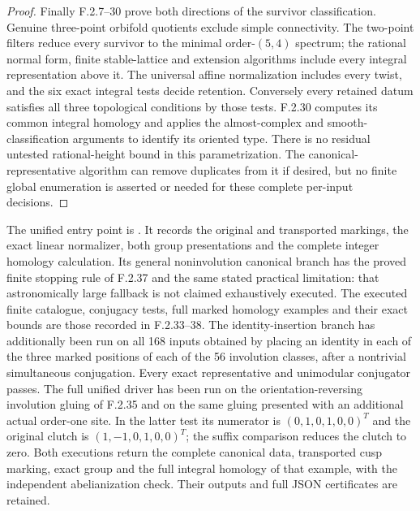 \begin{proof}
Finally F.2.7--30 prove both directions of the survivor
classification.  Genuine three-point orbifold quotients
exclude simple connectivity.  The two-point filters reduce
every survivor to the minimal order-$(5,4)$ spectrum; the
rational normal form, finite stable-lattice and extension
algorithms include every integral representation above it.
The universal affine normalization includes every twist,
and the six exact integral tests decide retention.
Conversely every retained datum satisfies all three
topological conditions by those tests.  F.2.30 computes
its common integral homology and applies the almost-complex
and smooth-classification arguments to identify its oriented
type.  There is no residual untested rational-height bound
in this parametrization.  The canonical-representative
algorithm can remove duplicates from it if desired, but
no finite global enumeration is asserted or needed for
these complete per-input decisions.
\end{proof}

The unified entry point is
.
It records the original and transported markings, the exact
linear normalizer, both group presentations and the complete
integer homology calculation.  Its general noninvolution
canonical branch has the proved finite stopping rule of
F.2.37 and the same stated practical limitation: that
astronomically large fallback is not claimed exhaustively
executed.  The executed finite catalogue, conjugacy tests,
full marked homology examples and their exact bounds are
those recorded in F.2.33--38.
The identity-insertion branch has additionally been run on
all 168 inputs obtained by placing an identity in each of
the three marked positions of each of the 56 involution
classes, after a nontrivial simultaneous conjugation.
Every exact representative and unimodular conjugator passes.
The full unified driver has been run on the orientation-reversing
involution gluing of F.2.35 and on the same gluing presented
with an additional actual order-one site.  In the latter
test its numerator is $(0,1,0,1,0,0)^T$ and the original
clutch is $(1,-1,0,1,0,0)^T$; the suffix comparison reduces
the clutch to zero.  Both executions return the complete
canonical data, transported cusp marking, exact group and
the full integral homology of that example, with the
independent abelianization check.  Their outputs and full
JSON certificates are retained.
